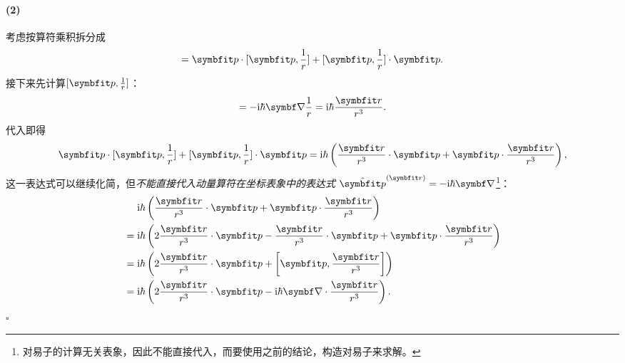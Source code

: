 \begin{tcolorbox}[breakable, title={\textbf{两个对易子的计算}}]
    \paragraph{(2)}
    考虑按算符乘积拆分成
    \begin{equation}
        [p^2,\frac{1}{r}] = \pp\cdot[\pp,\frac{1}{r}] + [\pp,\frac{1}{r}]\cdot\pp.
    \end{equation}
    接下来先计算$[\pp,\frac{1}{r}]$：
    \begin{equation}
        [\pp,\frac{1}{r}] = -\ii\hbar\del\frac{1}{r} = \ii\hbar\frac{\rr}{r^3}.
    \end{equation}
    代入即得
    \begin{equation}
        \pp\cdot[\pp,\frac{1}{r}] + [\pp,\frac{1}{r}]\cdot\pp = \ii\hbar\left( \frac{\rr}{r^3}\cdot\pp+\pp\cdot\frac{\rr}{r^3} \right),
    \end{equation}
    这一表达式可以继续化简，但\emph{不能直接代入动量算符在坐标表象中的表达式} $\hat{\pp}^{(\rr)}=-\ii\hbar\del$\footnote{对易子的计算无关表象，因此不能直接代入，而要使用之前的结论，构造对易子来求解。}：
    \begin{equation}
    \begin{aligned}
        &\quad\ \ii\hbar\left( \frac{\rr}{r^3}\cdot\pp+\pp\cdot\frac{\rr}{r^3} \right) \\
        &= \ii\hbar\left( 2\frac{\rr}{r^3}\cdot\pp - \frac{\rr}{r^3}\cdot\pp +\pp\cdot\frac{\rr}{r^3} \right) \\
        &= \ii\hbar\left( 2\frac{\rr}{r^3}\cdot\pp + \left[\pp, \frac{\rr}{r^3}\right] \right) \\
        &= \ii\hbar\left( 2\frac{\rr}{r^3}\cdot\pp - \ii\hbar\del\cdot\frac{\rr}{r^3} \right).
    \end{aligned}
    \end{equation}
    \hfill$\square$

\end{tcolorbox}


